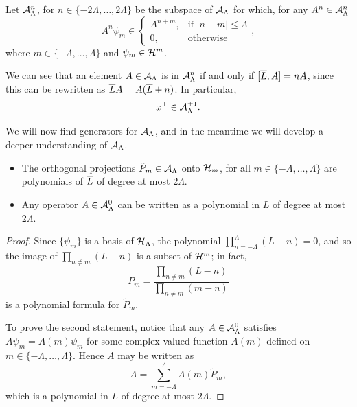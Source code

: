 \begin{definition}\label{definitionGradingOperatorsD2Cut}
Let $\mathcal A^n_\Lambda$, for $n \in \{-2\Lambda, \dots, 2\Lambda\}$ be the subspace of $\mathcal A_\Lambda$ for which, for any $A^n \in \mathcal A^n_\Lambda$
\begin{equation*}
    A^n \psi_m \in 
    \begin{cases}
        A^{n+m},& \text{if } |n+m| \leq \Lambda\\
        0, & \text{otherwise}
    \end{cases},
\end{equation*}
where $m \in \{-\Lambda, \dots, \Lambda\}$ and $\psi_m \in \mathcal H^m$.
\end{definition}

We can see that an element $A \in \mathcal A_\Lambda$ is in $\mathcal A^n_\Lambda$ if and only if $[\overline{L}, A] = nA$, since this can be rewritten as $\overline{L} A = A(\overline{L} + n)$. In particular, 
\begin{equation}\label{equationXPMGradeUpDownD2}
    x^\pm \in \mathcal A^{\pm 1}_\Lambda.
\end{equation}

\lin

We will now find generators for $\mathcal A_\Lambda$, and in the meantime we will develop a deeper understanding of $\mathcal A_\Lambda$.

\begin{proposition}\label{propositionAboutLProjectorsGeneralFunctionD2}
\hfill
    \begin{itemize}
    
    \item The orthogonal projections $\tilde P_m \in \mathcal A_\Lambda$ onto $\mathcal H_m$, for all $m \in \{-\Lambda, \dots, \Lambda\}$ are polynomials of $\overline{L}$ of degree at most $2 \Lambda$.
    
    \item Any operator $A \in \mathcal A^0_\Lambda$ can be written as a polynomial in $L$ of degree at most $2\Lambda$.
    
    \end{itemize}
\end{proposition}
\begin{proof}
Since $\{\psi_m\}$ is a basis of $\mathcal H_\Lambda$, the polynomial $\prod_{n = -\Lambda}^\Lambda (L - n) = 0$, and so the image of $\prod_{n \neq m} (L - n)$ is a subset of $\mathcal H^m$; in fact,
\begin{equation}\label{equationFormulaProjectionTildemD2}
    \tilde P_m = \frac{\prod_{n \neq m} (L - n)}{\prod_{n \neq m} (m - n)}
\end{equation}
is a polynomial formula for $\tilde P_m$.

To prove the second statement, notice that any $A \in \mathcal A^0_\Lambda$ satisfies $A \psi_m = A(m) \psi_m$ for some complex valued function $A(m)$ defined on $m \in \{-\Lambda, \dots, \Lambda\}$. Hence $A$ may be written as 
\begin{equation}
    A = \sum_{m = -\Lambda}^\Lambda A(m) \tilde P_m,
\end{equation} 
which is a polynomial in $L$ of degree at most $2\Lambda$.
\end{proof}

